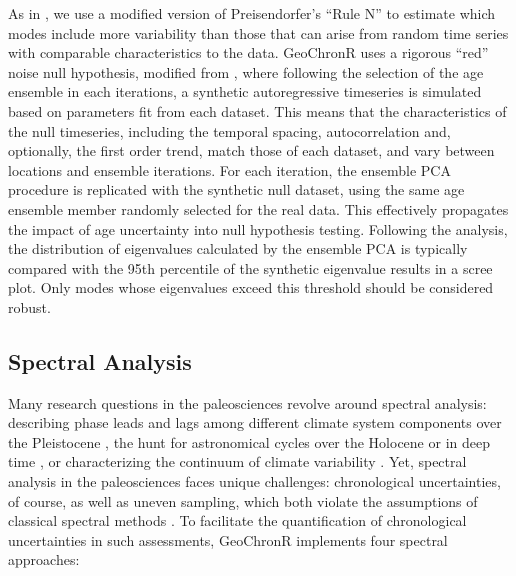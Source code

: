 \documentclass[gchron, manuscript]{copernicus}
\begin{document}
As in \citet{anchukaitis2013mceof}, we use a modified version of Preisendorfer's ``Rule N'' \citep{PreisendorferMobley1988} to estimate which modes include more variability than those that can arise from random time series with comparable characteristics to the data.
GeoChronR uses a rigorous ``red'' noise null hypothesis, modified from \citet{SchneiderNeumaier2001}, where following the selection of the age ensemble in each iterations, a synthetic autoregressive timeseries is simulated based on parameters fit from each dataset.
This means that the characteristics of the null timeseries, including the temporal spacing, autocorrelation and, optionally, the first order trend, match those of each dataset, and vary between locations and ensemble iterations.
For each iteration, the ensemble PCA procedure is replicated with the synthetic null dataset, using the same age ensemble member randomly selected for the real data.
This effectively propagates the impact of age uncertainty into null hypothesis testing.
Following the analysis, the distribution of eigenvalues calculated by the ensemble PCA is typically compared with the 95th percentile of the synthetic eigenvalue results in a scree plot.
Only modes whose eigenvalues exceed this threshold should be considered robust.

\hypertarget{sec:spec-theory}{%
\subsection{Spectral Analysis}\label{sec:spec-theory}}

Many research questions in the paleosciences revolve around spectral analysis: describing phase leads and lags among different climate system components over the Pleistocene \citep[SPECMAP,][\citet{khider2017}]{imbrie1984orbital}, the hunt for astronomical cycles over the Holocene \citep{bond2001} or in deep time \citep{MeyersSageman_2007, Meyers_2012, Meyers_2015, lisiecki2010}, or characterizing the continuum of climate variability \citep{Huybers_Curry2006, ZhuPNAS2019}.
Yet, spectral analysis in the paleosciences faces unique challenges: chronological uncertainties, of course, as well as uneven sampling, which both violate the assumptions of classical spectral methods \citep{Ghil02}.
To facilitate the quantification of chronological uncertainties in such assessments, GeoChronR implements four spectral approaches:
\end{document}
